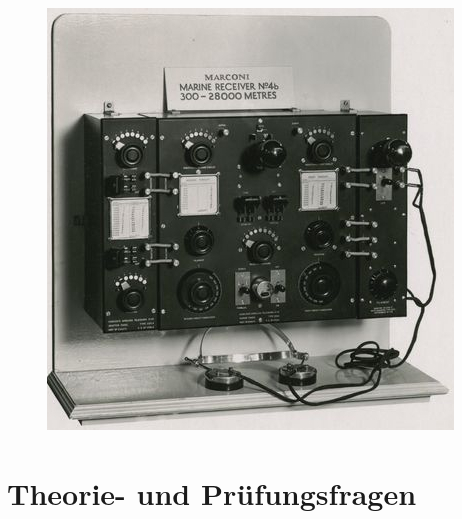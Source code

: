 \begin{figure}
	\vspace{-6cm}
  	\includegraphics[scale=0.35]{Betriebsarten/Bilder/receiver.jpg}
 	\vspace{-6cm}
	\end{figure}

\section*{Theorie- und Prüfungsfragen}




